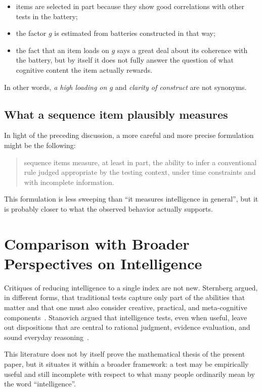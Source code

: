 \documentclass[10pt, a4paper]{article}
\theoremstyle{plain}
\theoremstyle{definition}
\theoremstyle{remark}
\begin{document}
\begin{itemize}
    \item items are selected in part because they show good correlations with
          other tests in the battery;
    \item the factor $g$ is estimated from batteries constructed in that way;
    \item the fact that an item loads on $g$ says a great deal about its
          coherence with the battery, but by itself it does not fully answer the
          question of what cognitive content the item actually rewards.
\end{itemize}

In other words, \emph{a high loading on $g$} and \emph{clarity of construct}
are not synonyms.

\subsection{What a sequence item plausibly measures}

In light of the preceding discussion, a more careful and more precise
formulation might be the following:

\begin{quote}
sequence items measure, at least in part, the ability to infer a conventional
rule judged appropriate by the testing context, under time constraints and with
incomplete information.
\end{quote}

This formulation is less sweeping than ``it measures intelligence in general'',
but it is probably closer to what the observed behavior actually supports.

\section{Comparison with Broader Perspectives on Intelligence}
\label{sec:broader}

Critiques of reducing intelligence to a single index are not new. Sternberg
argued, in different forms, that traditional tests capture only part of the
abilities that matter and that one must also consider creative, practical, and
meta-cognitive components~\cite{sternberg1985, sternberg1999}. Stanovich argued
that intelligence tests, even when useful, leave out dispositions that are
central to rational judgment, evidence evaluation, and sound everyday reasoning~\cite{stanovich2009}.

This literature does not by itself prove the mathematical thesis of the present
paper, but it situates it within a broader framework: a test may be empirically
useful and still incomplete with respect to what many people ordinarily mean by
the word ``intelligence''.
\end{document}
